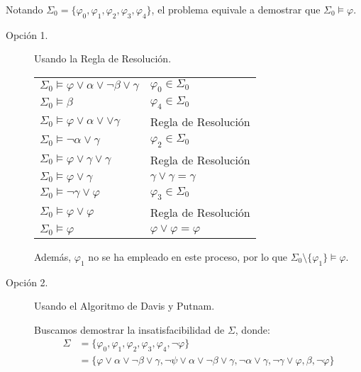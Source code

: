 \begin{ejercicio}
    Notando $\Sigma_0=\{\varphi_0,\varphi_1,\varphi_2,\varphi_3,\varphi_4\}$, el problema equivale a demostrar que $\Sigma_0\models \varphi$.
    \begin{description}
        \item[Opción 1.] Usando la Regla de Resolución.
        
        \begin{table}[H]
            \centering
            \begin{tabular}{ll}
                $\Sigma_0\models \varphi\lor \alpha\lor \lnot \beta \lor \gamma$ & $\varphi_0\in \Sigma_0$\\
                $\Sigma_0\models \beta$ & $\varphi_4\in \Sigma_0$\\
                $\Sigma_0\models \varphi\lor \alpha\lor \lor \gamma$ & Regla de Resolución\\
                $\Sigma_0\models \lnot \alpha\lor \gamma$ & $\varphi_2\in \Sigma_0$\\
                $\Sigma_0\models \varphi\lor \gamma\lor \gamma$ & Regla de Resolución\\
                $\Sigma_0\models \varphi\lor \gamma$ & $\gamma\lor \gamma= \gamma$\\
                $\Sigma_0\models \lnot \gamma\lor \varphi$ & $\varphi_3\in \Sigma_0$\\
                $\Sigma_0\models \varphi \lor \varphi$ & Regla de Resolución\\
                $\Sigma_0\models \varphi$ & $\varphi\lor \varphi = \varphi$
            \end{tabular}
        \end{table}

        Además, $\varphi_1$ no se ha empleado en este proceso, por lo que $\Sigma_0\setminus \{\varphi_1\}\models \varphi$.

        \item[Opción 2.] Usando el Algoritmo de Davis y Putnam.
        
        Buscamos demostrar la insatisfacibilidad de $\Sigma$, donde:
        \begin{align*}
            \Sigma &= \{\varphi_0,\varphi_1,\varphi_2,\varphi_3,\varphi_4, \lnot \varphi\}\\
            &= \{\varphi\lor \alpha\lor \lnot \beta \lor \gamma, \lnot \psi\lor \alpha\lor \lnot \beta\lor \gamma, \lnot \alpha\lor \gamma, \lnot \gamma\lor \varphi, \beta,\lnot \varphi\}
        \end{align*}


\end{description}
\end{ejercicio}
